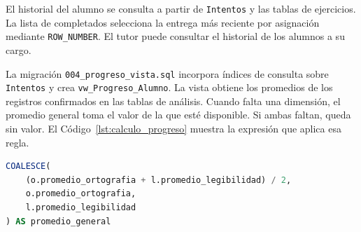 El historial del alumno se consulta a partir de \texttt{Intentos} y las tablas de ejercicios. La lista de completados selecciona la entrega más reciente por asignación mediante \texttt{ROW\_NUMBER}. El tutor puede consultar el historial de los alumnos a su cargo.

La migración \texttt{004\_progreso\_vista.sql} incorpora índices de consulta sobre \texttt{Intentos} y crea \texttt{vw\_Progreso\_Alumno}. La vista obtiene los promedios de los registros confirmados en las tablas de análisis. Cuando falta una dimensión, el promedio general toma el valor de la que esté disponible. Si ambas faltan, queda sin valor. El Código~\ref{lst:calculo_progreso} muestra la expresión que aplica esa regla.

\begin{lstlisting}[language=SQL, caption={Cálculo del promedio general en la vista de progreso}, label={lst:calculo_progreso}]
COALESCE(
    (o.promedio_ortografia + l.promedio_legibilidad) / 2,
    o.promedio_ortografia,
    l.promedio_legibilidad
) AS promedio_general
\end{lstlisting}








